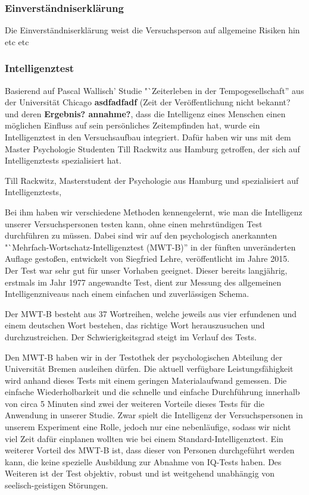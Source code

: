 \documentclass{Bericht}
\begin{document}
\subsubsection{Einverständniserklärung}

Die Einverständniserklärung weist die Versuchsperson auf allgemeine Risiken hin etc etc 

\subsubsection{Intelligenztest}
Basierend auf Pascal Wallisch' Studie "`Zeiterleben in der Tempogesellschaft'' aus der Universität Chicago \textbf{asdfadfadf} (Zeit der Veröffentlichung nicht bekannt? \cite{Tempo} und deren \textbf{Ergebnis? annahme?}, dass die Intelligenz eines Menschen einen möglichen Einfluss auf sein persönliches Zeitempfinden hat, wurde ein Intelligenztest in den Versuchsaufbau integriert.
Dafür haben wir uns mit dem Master Psychologie Studenten Till Rackwitz aus Hamburg getroffen, der sich auf Intelligenztests spezialisiert hat.

Till Rackwitz, Masterstudent der Psychologie aus Hamburg und spezialisiert auf Intelligenztests, 


 Bei ihm haben wir verschiedene Methoden kennengelernt, wie man die Intelligenz unserer Versuchspersonen testen kann, ohne einen mehrstündigen Test durchführen zu müssen. Dabei sind wir auf den psychologisch anerkannten "`Mehrfach-Wortschatz-Intelligenztest (MWT-B)'' in der fünften unveränderten Auflage gestoßen, entwickelt von Siegfried Lehre, veröffentlicht im Jahre 2015. Der Test war sehr gut für unser Vorhaben geeignet. Dieser bereits langjährig, erstmals im Jahr 1977 angewandte Test, dient zur Messung des allgemeinen Intelligenzniveaus nach einem einfachen und zuverlässigen Schema.

Der MWT-B besteht aus 37 Wortreihen, welche jeweils aus vier erfundenen und einem deutschen Wort bestehen, das richtige Wort herauszusuchen und durchzustreichen. Der Schwierigkeitsgrad steigt im Verlauf des Tests.

Den MWT-B haben wir in der Testothek der psychologischen Abteilung der Universität Bremen ausleihen dürfen. Die aktuell verfügbare Leistungsfähigkeit wird anhand dieses Tests mit einem geringen Materialaufwand gemessen. Die einfache Wiederholbarkeit und die schnelle und einfache Durchführung innerhalb von circa 5 Minuten sind zwei der weiteren Vorteile dieses Tests für die Anwendung in unserer Studie. Zwar spielt die Intelligenz der Versuchspersonen in unserem Experiment eine Rolle, jedoch nur eine nebenläufige, sodass wir nicht viel Zeit dafür einplanen wollten wie bei einem Standard-Intelligenztest. Ein weiterer Vorteil des MWT-B ist, dass dieser von Personen durchgeführt werden kann, die keine spezielle Ausbildung zur Abnahme von IQ-Tests haben. Des Weiteren ist der Test objektiv, robust und ist weitgehend unabhängig von seelisch-geistigen Störungen.
\end{document}
